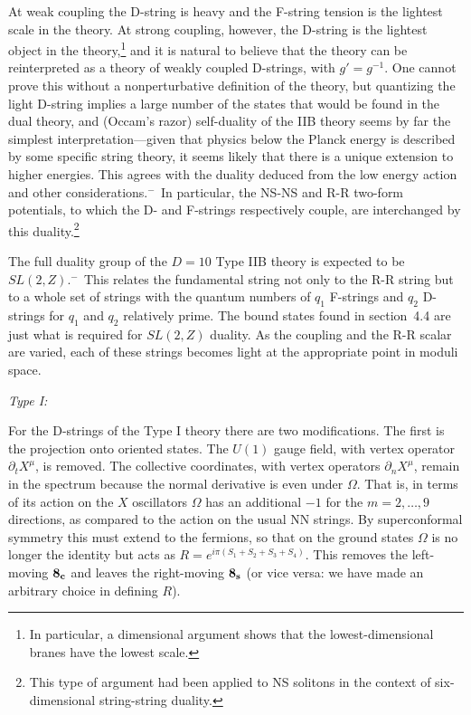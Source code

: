 At weak coupling the D-string is heavy and the F-string
tension is the lightest scale in the theory.  At strong coupling, however,
the D-string is the lightest object in the theory,\footnote
{In particular, a dimensional argument shows that the lowest-dimensional
branes have the lowest scale.\cite{hullscale}} and it is natural to believe
that the theory can be reinterpreted as a theory of weakly coupled
D-strings, with
$g' = g^{-1}$.  One cannot prove this without a nonperturbative definition
of the theory, but quantizing the light D-string implies a large number of
the states that would be found in the dual theory, and (Occam's
razor) self-duality of the IIB theory seems by far the simplest
interpretation---given that physics below the Planck
energy is described by some specific string theory, it seems likely that
there is a unique extension to higher energies.  This agrees with the duality
deduced from the low energy action and other
considerations.\cite{hullt}$^{\!-\,}$\cite{wit} In particular, the NS-NS and
R-R two-form potentials, to which the D- and F-strings respectively couple,
are interchanged by this duality.\footnote
{This type of argument had been applied to NS solitons in the context
of six-dimensional string-string duality.\cite{hetsol}}

The full duality group of the $D=10$ Type IIB theory is expected to be
$SL(2,Z)$.\cite{hullt}$^{\!-\,}$\cite{wit}  This relates the fundamental
string not only to the R-R string but to a whole set of strings with the
quantum numbers of $q_1$ F-strings and $q_2$ D-strings for $q_1$ and $q_2$ 
relatively prime.\cite{schwarz}  The bound states found in section~4.4 are
just what is required for $SL(2,Z)$ duality.\cite{witbound}  As the
coupling and the R-R scalar are varied, each of these strings becomes light
at the appropriate point in moduli space.

{\it Type I:}

For the D-strings of the Type I theory there are two
modifications.\cite{polwit}
The first is the projection onto oriented states.  The $U(1)$ gauge field,
with vertex operator $\partial_t X^\mu$, is removed.  The collective
coordinates, with vertex operators
$\partial_n X^\mu$, remain in the spectrum because the normal derivative is
even under $\Omega$.  That is, in terms of its action on the $X$ oscillators
$\Omega$ has an additional $-1$ for the $m=2,\ldots,9$
directions, as compared to the action on the usual NN strings.  By
superconformal symmetry this must extend to the fermions, so that on the
ground states $\Omega$ is no longer the identity but acts as
$R=e^{i\pi(S_1+S_2+S_3+S_4)}$.  This removes the left-moving $\bf 8_c$ and
leaves the right-moving $\bf 8_s$ (or vice versa: we have made an arbitrary
choice in defining $R$).

